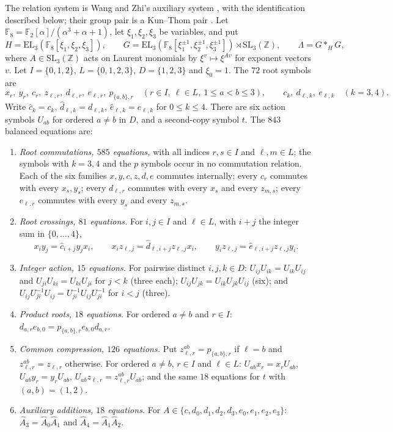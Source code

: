\documentclass[11pt]{article}
\begin{document}
The relation system is Wang and Zhi's auxiliary system \cite[Sections~2 and~5.1]{WangZhi26}, with the identification described below; their group pair is a Kun--Thom pair \cite[Theorem~E]{KunThom26}.  Let $\mathbb F_8=\mathbb F_2[\alpha]/(\alpha^3+\alpha+1)$, let $\xi_1,\xi_2,\xi_3$ be variables, and put
\[
 H=\mathrm{EL}_3(\mathbb F_8[\xi_1,\xi_2,\xi_3]),\qquad
 G=\mathrm{EL}_3(\mathbb F_8[\xi_1^{\pm1},\xi_2^{\pm1},\xi_3^{\pm1}])\rtimes\mathrm{SL}_3(\mathbb Z),\qquad \Lambda=G*_HG,
\]
where $A\in\mathrm{SL}_3(\mathbb Z)$ acts on Laurent monomials by $\xi^v\mapsto\xi^{Av}$ for exponent vectors $v$.  Let $I=\{0,1,2\}$, $L=\{0,1,2,3\}$, $D=\{1,2,3\}$ and $\xi_0=1$.  The $72$ root symbols are
\[
 x_r,\ y_r,\ c_r,\ z_{\ell,r},\ d_{\ell,r},\ e_{\ell,r},\ p_{\{a,b\},r}\quad(r\in I,\ \ell\in L,\ 1\le a<b\le3),\qquad c_k,\ d_{\ell,k},\ e_{\ell,k}\quad(k=3,4).
\]
Write $\widehat c_k=c_k$, $\widehat d_{\ell,k}=d_{\ell,k}$, $\widehat e_{\ell,k}=e_{\ell,k}$ for $0\le k\le4$.  There are six action symbols $U_{ab}$ for ordered $a\ne b$ in $D$, and a second-copy symbol $t$.  The $843$ balanced equations are:
\begin{enumerate}[label=(R\arabic*)]
\item \emph{Root commutations, $585$ equations,} with all indices $r,s\in I$ and $\ell,m\in L$; the symbols with $k=3,4$ and the $p$ symbols occur in no commutation relation.  Each of the six families $x,y,c,z,d,e$ commutes internally; every $c_r$ commutes with every $x_s,y_s$; every $d_{\ell,r}$ commutes with every $x_s$ and every $z_{m,s}$; every $e_{\ell,r}$ commutes with every $y_s$ and every $z_{m,s}$.
\item \emph{Root crossings, $81$ equations.}  For $i,j\in I$ and $\ell\in L$, with $i+j$ the integer sum in $\{0,\dots,4\}$,
\[
 x_iy_j=\widehat c_{i+j}y_jx_i,\qquad x_iz_{\ell,j}=\widehat d_{\ell,i+j}z_{\ell,j}x_i,\qquad y_iz_{\ell,j}=\widehat e_{\ell,i+j}z_{\ell,j}y_i.
\]
\item \emph{Integer action, $15$ equations.}  For pairwise distinct $i,j,k\in D$: $U_{ij}U_{ik}=U_{ik}U_{ij}$ and $U_{ji}U_{ki}=U_{ki}U_{ji}$ for $j<k$ (three each); $U_{ij}U_{jk}=U_{ik}U_{jk}U_{ij}$ (six); and $U_{ij}U_{ji}^{-1}U_{ij}=U_{ji}^{-1}U_{ij}U_{ji}^{-1}$ for $i<j$ (three).
\item \emph{Product roots, $18$ equations.}  For ordered $a\ne b$ and $r\in I$: $d_{a,r}e_{b,0}=p_{\{a,b\},r}e_{b,0}d_{a,r}$.
\item \emph{Common compression, $126$ equations.}  Put $z^{ab}_{\ell,r}=p_{\{a,b\},r}$ if $\ell=b$ and $z^{ab}_{\ell,r}=z_{\ell,r}$ otherwise.  For ordered $a\ne b$, $r\in I$ and $\ell\in L$: $U_{ab}x_r=x_rU_{ab}$, $U_{ab}y_r=y_rU_{ab}$, $U_{ab}z_{\ell,r}=z^{ab}_{\ell,r}U_{ab}$; and the same $18$ equations for $t$ with $(a,b)=(1,2)$.
\item \emph{Auxiliary additions, $18$ equations.}  For $A\in\{c,d_0,d_1,d_2,d_3,e_0,e_1,e_2,e_3\}$: $\widehat A_3=\widehat A_0\widehat A_1$ and $\widehat A_4=\widehat A_1\widehat A_2$.
\end{enumerate}
\end{document}
